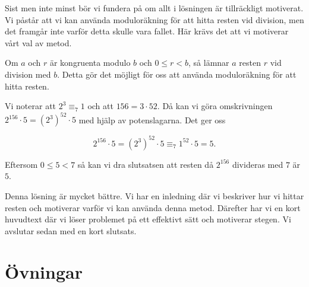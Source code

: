 \documentclass[titlepage]{article}
\begin{document}
Sist men inte minst bör vi fundera på om allt i lösningen är tillräckligt motiverat. Vi påstår att vi kan använda moduloräkning för att hitta resten vid division, men det framgår inte varför detta skulle vara fallet. Här krävs det att vi motiverar vårt val av metod.

\begin{center}
    \begin{tcolorbox}[width=\linewidth,colback={green!25!white},title={\textbf{Lösning 3 - Bättre}},outer arc=0mm,colupper=black]
        Om $a$ och $r$ är kongruenta modulo $b$ och $0\leq r<b$, så lämnar $a$ resten $r$ vid division med $b$. Detta gör det möjligt för oss att använda moduloräkning för att hitta resten. \vspace{2mm}

        Vi noterar att $2^3 \equiv_7 1$ och att $156 = 3\cdot 52$. Då kan vi göra omskrivningen $2^{156}\cdot 5 = (2^3)^{52} \cdot 5$ med hjälp av potenslagarna. Det ger oss

        $$2^{156}\cdot 5 = (2^3)^{52} \cdot 5 \equiv_7 1^{52} \cdot 5 = 5.$$

        Eftersom $0\leq 5<7$ så kan vi dra slutsatsen att resten då $2^{156}$ divideras med $7$ är $5$.
    \end{tcolorbox} 
    \end{center}

Denna lösning är mycket bättre. Vi har en inledning där vi beskriver hur vi hittar resten och motiverar varför vi kan använda denna metod. Därefter har vi en kort huvudtext där vi löser problemet på ett effektivt sätt och motiverar stegen. Vi avslutar sedan med en kort slutsats.




\section{Övningar}
\end{document}
